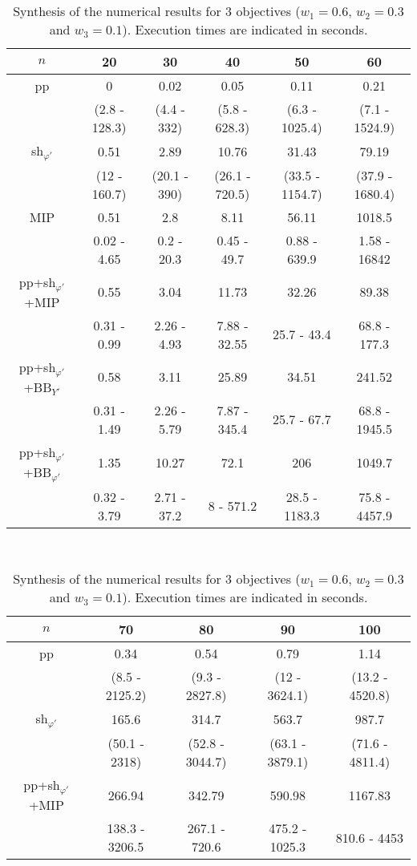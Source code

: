 \documentclass[final,3p,times]{elsarticle}
\begin{document}
\begin{table}[!h]
  \begin{center}
{\small \begin{tabular}{|c|ccccc|}    \hline
      \rule[1pt]{0pt}{13pt} 
   $n$ & 20&30&40&50&60\\
    \hline
    pp  &0&0.02&0.05&0.11&0.21\\
    	 &(2.8 - 128.3)&(4.4 - 332)&(5.8 - 628.3)&(6.3 - 1025.4)&(7.1 - 1524.9)\\
    sh$_{\varphi'}$&0.51&2.89&10.76&31.43&79.19\\
         &(12 - 160.7)&(20.1 - 390)&(26.1 - 720.5)&(33.5 - 1154.7)&(37.9 - 1680.4)\\
   \hline
 MIP&0.51&2.8&8.11&56.11&1018.5\\
      &0.02 - 4.65&0.2 - 20.3&0.45 - 49.7&0.88 - 639.9&1.58
      - 16842\\  
pp+sh$_{\varphi'}$+MIP&0.55&3.04&11.73&32.26&89.38\\
   &0.31 - 0.99&2.26 - 4.93&7.88 - 32.55&25.7 - 43.4&68.8
   - 177.3\\ 
pp+sh$_{\varphi'}$+BB$_{Y'}$&0.58&3.11&25.89&34.51&241.52\\
     &0.31 - 1.49&2.26 - 5.79&7.87 - 345.4&25.7 - 67.7&68.8 - 1945.5\\
pp+sh$_{\varphi'}$+BB$_{\varphi'}$&1.35&10.27&72.1&206&1049.7\\
    &0.32 - 3.79&2.71 - 37.2&8 - 571.2&28.5 - 1183.3&75.8 - 4457.9\\
  \hline
    \end{tabular}\\ [2ex]
\begin{tabular}{|c|cccc|}   \hline
 \rule[1pt]{0pt}{13pt} 
  $n$ & 70&80&90&100\\
  \hline
  pp & 0.34&0.54&0.79&1.14\\
    &(8.5 - 2125.2)&(9.3 - 2827.8)&(12 - 3624.1)&(13.2 - 4520.8)\\
  sh$_{\varphi'}$&165.6&314.7&563.7&987.7\\
  &(50.1 - 2318)&(52.8 - 3044.7)&(63.1 - 3879.1)&(71.6 - 4811.4)\\
  \hline
 pp+sh$_{\varphi'}$+MIP&266.94&342.79&590.98&1167.83\\
 &138.3 - 3206.5&267.1 - 720.6&475.2 - 1025.3&810.6 - 4453\\
\hline
\end{tabular}
}
\end{center}
\caption{\label{tabPL1} Synthesis of the numerical results for 3 objectives ($w_1 = 0.6$, $w_2 = 0.3$ and $w_3 = 0.1$). Execution times are indicated in seconds.
}
\end{table}
\end{document}
